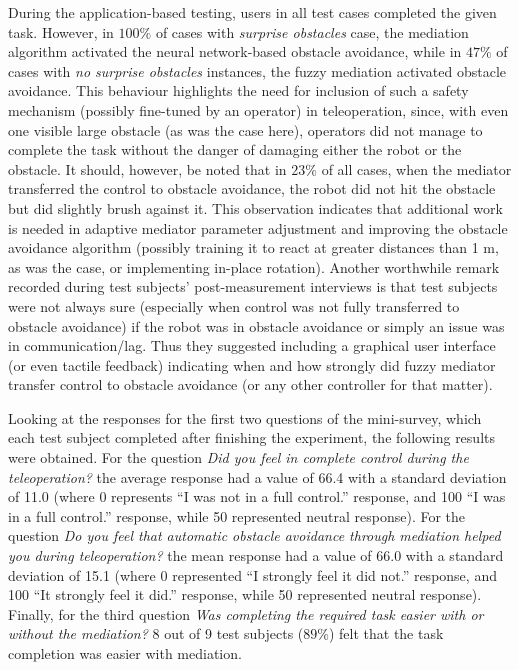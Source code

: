 During the application-based testing, users in all test cases completed the given task. However, in $100\%$ of cases with \emph{surprise obstacles} case, the mediation algorithm activated the neural network-based obstacle avoidance, while in $47\%$ of cases with \emph{no surprise obstacles} instances, the fuzzy mediation activated obstacle avoidance. This behaviour highlights the need for inclusion of such a safety mechanism (possibly fine-tuned by an operator) in teleoperation, since, with even one visible large obstacle (as was the case here), operators did not manage to complete the task without the danger of damaging either the robot or the obstacle. It should, however, be noted that in $23\%$ of all cases, when the mediator transferred the control to obstacle avoidance, the robot did not hit the obstacle but did slightly brush against it. This observation indicates that additional work is needed in adaptive mediator parameter adjustment and improving the obstacle avoidance algorithm (possibly training it to react at greater distances than 1 m, as was the case, or implementing in-place rotation). Another worthwhile remark recorded during test subjects' post-measurement interviews is that test subjects were not always sure (especially when control was not fully transferred to obstacle avoidance) if the robot was in obstacle avoidance or simply an issue was in communication/lag. Thus they suggested including a graphical user interface (or even tactile feedback) indicating when and how strongly did fuzzy mediator transfer control to obstacle avoidance (or any other controller for that matter).

Looking at the responses for the first two questions of the mini-survey, which each test subject completed after finishing the experiment, the following results were obtained. For the question \emph{Did you feel in complete control during the teleoperation?} the average response had a value of 66.4 with a standard deviation of 11.0 (where 0 represents ``I was not in a full control.'' response, and 100 ``I was in a full control.'' response, while 50 represented neutral response). For the question \emph{Do you feel that automatic obstacle avoidance through mediation helped you during teleoperation?} the mean response had a value of 66.0 with a standard deviation of 15.1 (where 0 represented ``I strongly feel it did not.'' response, and 100 ``It strongly feel it did.'' response, while 50 represented neutral response). Finally, for the third question \emph{Was completing the required task easier with or without the mediation?} 8 out of 9 test subjects ($89\%$) felt that the task completion was easier with mediation.

